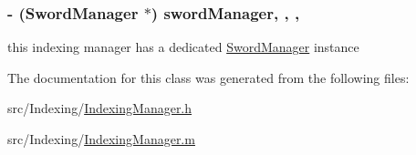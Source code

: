 \hypertarget{interface_indexing_manager_a5c5d0eea93f588d2bcc46da1b6db122e}{
\subsubsection[{sword\-Manager}]{\setlength{\rightskip}{0pt plus 5cm}-\/ ({\bf Sword\-Manager} $\ast$) sword\-Manager\hspace{0.3cm}{\ttfamily [read]}, {\ttfamily [write]}, {\ttfamily [atomic]}, {\ttfamily [retain]}}}\label{interface_indexing_manager_a5c5d0eea93f588d2bcc46da1b6db122e}
this indexing manager has a dedicated \hyperlink{interface_sword_manager}{Sword\-Manager} instance 

The documentation for this class was generated from the following files\-:\begin{DoxyCompactItemize}
\item 
src/\-Indexing/\hyperlink{_indexing_manager_8h}{Indexing\-Manager.\-h}\item 
src/\-Indexing/\hyperlink{_indexing_manager_8m}{Indexing\-Manager.\-m}\end{DoxyCompactItemize}
